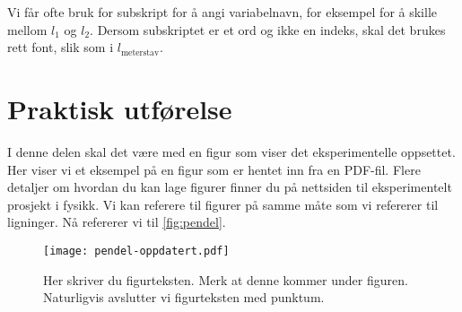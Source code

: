 Vi får ofte bruk for subskript for å angi variabelnavn, for eksempel for å skille mellom $l_1$ og $l_2$. Dersom subskriptet er et ord og ikke en indeks, skal det brukes rett font, slik som i $l_\text{meterstav}$.



\section{Praktisk utførelse}
I denne delen skal det være med en figur som viser det eksperimentelle oppsettet. Her viser vi et eksempel på en figur som er hentet inn fra en PDF-fil. Flere detaljer om hvordan du kan lage figurer finner du på nettsiden til eksperimentelt prosjekt i fysikk. Vi kan referere til figurer på samme måte som vi refererer til ligninger. Nå refererer vi til \autoref{fig:pendel}.

\begin{figure}[tbp] 
\centering %
\texttt{[image: pendel-oppdatert.pdf]}
\caption{Her skriver du figurteksten. Merk at denne kommer under figuren. Naturligvis avslutter vi figurteksten med punktum.}
\label{fig:pendel} %
\end{figure}


